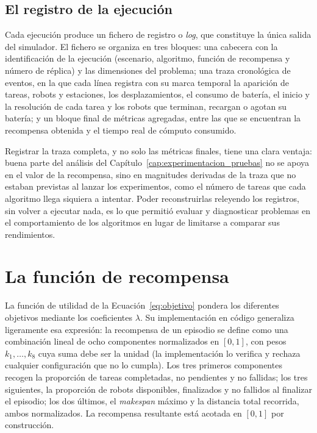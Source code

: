 \subsection{El registro de la ejecución} \label{subsec:mat-logger}

Cada ejecución produce un fichero de registro o \textit{log}, que constituye la única salida del simulador. El fichero se organiza en tres bloques: una cabecera con la identificación de la ejecución (escenario, algoritmo, función de recompensa y número de réplica) y las dimensiones del problema; una traza cronológica de eventos, en la que cada línea registra con su marca temporal la aparición de tareas, robots y estaciones, los desplazamientos, el consumo de batería, el inicio y la resolución de cada tarea y los robots que terminan, recargan o agotan su batería; y un bloque final de métricas agregadas, entre las que se encuentran la recompensa obtenida y el tiempo real de cómputo consumido.

Registrar la traza completa, y no solo las métricas finales, tiene una clara ventaja: buena parte del análisis del Capítulo~\ref{cap:experimentacion_pruebas} no se apoya en el valor de la recompensa, sino en magnitudes derivadas de la traza que no estaban previstas al lanzar los experimentos, como el número de tareas que cada algoritmo llega siquiera a intentar. Poder reconstruirlas releyendo los registros, sin volver a ejecutar nada, es lo que permitió evaluar y diagnosticar problemas en el comportamiento de los algoritmos en lugar de limitarse a comparar sus rendimientos.

\section{La función de recompensa} \label{sec:mat-recompensa}

La función de utilidad de la Ecuación~\eqref{eq:objetivo} pondera los diferentes objetivos mediante los coeficientes $\lambda$. Su implementación en código generaliza ligeramente esa expresión: la recompensa de un episodio se define como una combinación lineal de ocho componentes normalizados en $[0,1]$, con pesos $k_1,\dots,k_8$ cuya suma debe ser la unidad (la implementación lo verifica y rechaza cualquier configuración que no lo cumpla). Los tres primeros componentes recogen la proporción de tareas completadas, no pendientes y no fallidas; los tres siguientes, la proporción de robots disponibles, finalizados y no fallidos al finalizar el episodio; los dos últimos, el \textit{makespan} máximo y la distancia total recorrida, ambos normalizados. La recompensa resultante está acotada en $[0,1]$ por construcción.

